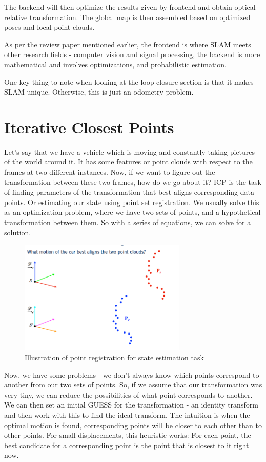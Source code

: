 The backend will then optimize the results given by frontend and obtain optical relative transformation. The global map is then assembled based on optimized poses and local point clouds.

As per the review paper mentioned earlier, the frontend is where SLAM meets other research fields - computer vision and signal processing, the backend is more mathematical and involves optimizations, and probabilistic estimation.

One key thing to note when looking at the loop closure section is that it makes SLAM unique. Otherwise, this is just an odometry problem. 

\section{Iterative Closest Points}

Let's say that we have a vehicle which is moving and constantly taking pictures of the world around it. It has some features or point clouds with respect to the frames at two different instances. Now, if we want to figure out the transformation between these two frames, how do we go about it? ICP is the task of finding parameters of the transformation that best aligns corresponding data points. Or estimating our state using point set registration. We usually solve this as an optimization problem, where we have two sets of points, and a hypothetical transformation between them. So with a series of equations, we can solve for a solution.

\begin{figure}
    \centering
    \includegraphics[width=8cm]{img/icp.png}
    \caption{Illustration of point registration for state estimation task}
    \label{fig:state_estimate}
\end{figure}

Now, we have some problems - we don't always know which points correspond to another from our two sets of points. So, if we assume that our transformation was very tiny, we can reduce the possibilities of what point corresponds to another. We can then set an initial GUESS for the transformation - an identity transform and then work with this to find the ideal transform. The intuition is when the optimal motion is found, corresponding points will be closer to each other than to other points. For small displacements, this heuristic works: For each point, the best candidate for a corresponding point is the point that is closest to it right now.

